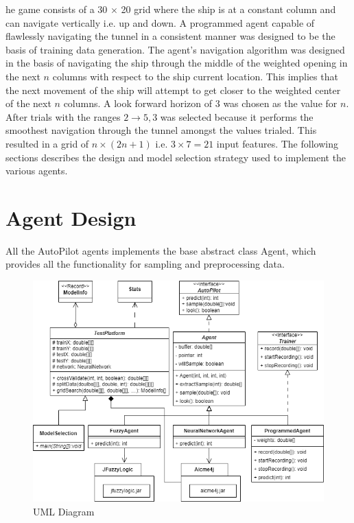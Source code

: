 \documentclass[10pt,journal,compsoc]{IEEEtran}
\begin{document}
he game consists
of a 30 $\times$ 20 grid where the ship is at a constant column and can navigate vertically i.e. up and 
down. A programmed agent capable of flawlessly navigating the tunnel in a consistent manner was designed
to be the basis of training data generation. The agent's navigation algorithm was designed in the basis 
of navigating the ship through the middle of the weighted opening in the next $n$ columns with respect to 
the ship current location. This implies that the next movement of the ship will attempt to get closer to 
the weighted center of the next $n$ columns. A look forward horizon of $3$ was chosen as the value for $n$.
After trials with the ranges $2 \to 5, 3$ was selected because it performs the smoothest navigation through
the tunnel amongst the values trialed. This resulted in a grid of $n \times (2n + 1)$ i.e. $3 \times 7 = 21$ 
input features. The following sections describes the design and model selection strategy used to implement
the various agents. 

\section{Agent Design}
All the AutoPilot agents implements the base abstract class Agent, which provides all the functionality for 
sampling and preprocessing data. 

\begin{figure}
    \centering
    \includegraphics[width=\linewidth]{uml.png}
    \caption{UML Diagram}
    \label{fig:uml}
\end{figure}
\end{document}
